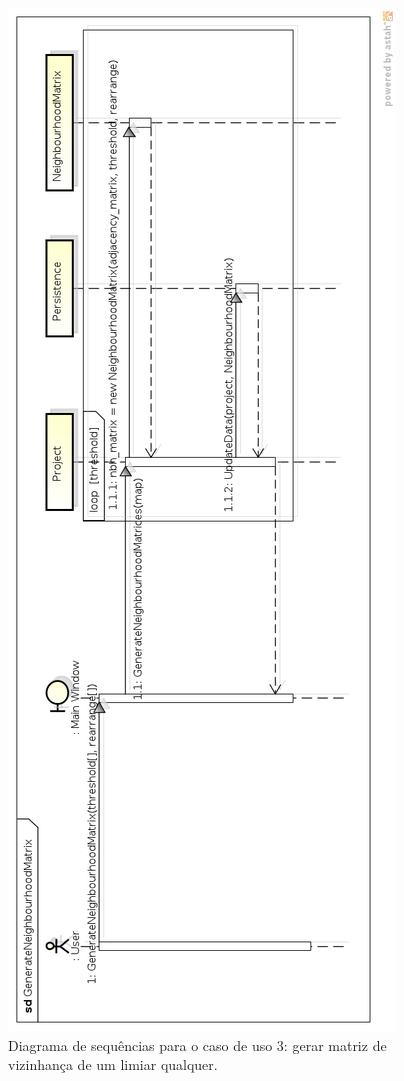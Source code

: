 \begin{figure}
\centering
\includegraphics[scale=0.37]{generate-neighbourhood-matrix}
\caption{Diagrama de sequências para o caso de uso 3: gerar matriz de vizinhança de um limiar qualquer.}
\label{fig:generate-neighbourhood-matrix}
\end{figure}

